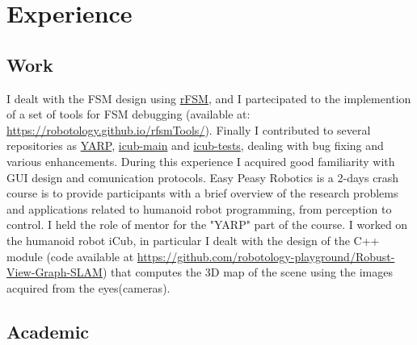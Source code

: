 \documentclass[10pt,a4paper]{moderncv}
\begin{document}
\section{Experience}
\subsection{Work}
{I dealt with the FSM design using \href{https://people.mech.kuleuven.be/~bruyninc/rFSM/doc/README.html}{rFSM}, and I partecipated to the implemention of a set of tools for FSM debugging (available at: \url{https://robotology.github.io/rfsmTools/}).
Finally I contributed to several repositories as \href{https://github.com/robotology/yarp}{YARP}, \href{https://github.com/robotology/icub-main}{icub-main} and \href{https://github.com/robotology/icub-tests}{icub-tests}, dealing with bug fixing and various enhancements. During this experience I acquired good familiarity with GUI design and comunication protocols.} 
{Easy Peasy Robotics is a 2-days crash course is to provide participants with a brief overview of the research problems and applications related to humanoid robot programming, from perception to control.
I held the role of mentor for the "YARP" part of the course.
}
{I worked on the humanoid robot iCub, in particular I dealt with the design of the C++ module (code available at \url{https://github.com/robotology-playground/Robust-View-Graph-SLAM}) that computes the 3D map of the scene using the images acquired from the eyes(cameras).} 
\subsection{Academic}
\end{document}
